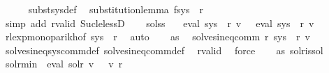 \begin{isabellebody}
\ \ \ \ \isamarkupfalse%
\ subst{\isacharunderscore}{\kern0pt}sys{\isacharunderscore}{\kern0pt}def\ \isamarkupfalse%
\ substitution{\isacharunderscore}{\kern0pt}lemma{\isacharbrackleft}{\kern0pt}\ f{\isacharequal}{\kern0pt}{\isachardoublequoteopen}sys\ {\isacharbang}{\kern0pt}\ r{\isachardoublequoteclose}{\isacharbrackright}{\kern0pt}\isanewline
\ \ \ \ \isamarkupfalse%
\ {\isacharparenleft}{\kern0pt}simp\ add{\isacharcolon}{\kern0pt}\ r{\isacharunderscore}{\kern0pt}valid\ Suc{\isacharunderscore}{\kern0pt}le{\isacharunderscore}{\kern0pt}lessD{\isacharparenright}{\kern0pt}\isanewline
\ \ \isamarkupfalse%
\ sols{\isacharunderscore}{\kern0pt}s{}\ \isamarkupfalse%
\ {\isachardoublequoteopen}{\isasymPsi}\ {\isacharparenleft}{\kern0pt}eval\ {\isacharparenleft}{\kern0pt}sys{\isacharprime}{\kern0pt}\ {\isacharbang}{\kern0pt}\ r{\isacharparenright}{\kern0pt}\ v{}{\isacharparenright}{\kern0pt}\ {\isasymsubseteq}\ {\isasymPsi}\ {\isacharparenleft}{\kern0pt}eval\ {\isacharparenleft}{\kern0pt}sys\ {\isacharbang}{\kern0pt}\ r{\isacharparenright}{\kern0pt}\ v{}{\isacharparenright}{\kern0pt}{\isachardoublequoteclose}\isanewline
\ \ \ \ \isamarkupfalse%
\ rlexp{\isacharunderscore}{\kern0pt}mono{\isacharunderscore}{\kern0pt}parikh{\isacharbrackleft}{\kern0pt}of\ {\isachardoublequoteopen}sys\ {\isacharbang}{\kern0pt}\ r{\isachardoublequoteclose}{\isacharbrackright}{\kern0pt}\ \isamarkupfalse%
\ auto\isanewline
\ \ \isamarkupfalse%
\ as\ \isamarkupfalse%
\ {\isachardoublequoteopen}solves{\isacharunderscore}{\kern0pt}ineq{\isacharunderscore}{\kern0pt}comm\ r\ {\isacharparenleft}{\kern0pt}sys{\isacharprime}{\kern0pt}\ {\isacharbang}{\kern0pt}\ r{\isacharparenright}{\kern0pt}\ v{}{\isachardoublequoteclose}\isanewline
\ \ \ \ \isamarkupfalse%
\ solves{\isacharunderscore}{\kern0pt}ineq{\isacharunderscore}{\kern0pt}sys{\isacharunderscore}{\kern0pt}comm{\isacharunderscore}{\kern0pt}def\ solves{\isacharunderscore}{\kern0pt}ineq{\isacharunderscore}{\kern0pt}comm{\isacharunderscore}{\kern0pt}def\ \isamarkupfalse%
\ r{\isacharunderscore}{\kern0pt}valid\ \isamarkupfalse%
\ force\isanewline
\ \ \isamarkupfalse%
\ as\ sol{\isacharunderscore}{\kern0pt}r{\isacharunderscore}{\kern0pt}is{\isacharunderscore}{\kern0pt}sol\ \isamarkupfalse%
\ sol{\isacharunderscore}{\kern0pt}r{\isacharunderscore}{\kern0pt}min{\isacharcolon}{\kern0pt}\ {\isachardoublequoteopen}{\isasymPsi}\ {\isacharparenleft}{\kern0pt}eval\ sol{\isacharunderscore}{\kern0pt}r\ v{}{\isacharparenright}{\kern0pt}\ {\isasymsubseteq}\ {\isasymPsi}\ {\isacharparenleft}{\kern0pt}v{}\ r{\isacharparenright}{\kern0pt}{\isachardoublequoteclose}\isanewline

\end{isabellebody}
